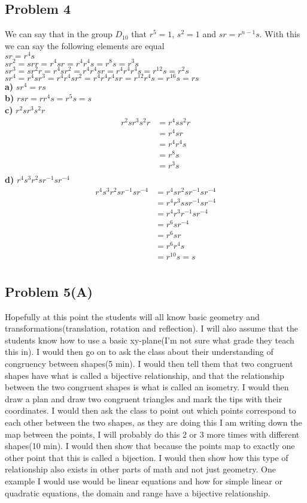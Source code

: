 \documentclass[12pt]{article}
\begin{document}
\subsection*{Problem 4}
We can say that in the group $D_{10}$ that $r^5 = 1$, $s^2 = 1$ and $sr = r^{n-1}s$. With this we can say the following elements are equal\\
$sr = r^4s$\\
$sr^2 = sr  r = r^4  s  r = r^4  r^4  s = r^8  s = r^3s$\\
$sr^3 = sr^2  r = r^4  s  r^2 = r^4  r^4  s  r = r^4  r^4  r^4  s =r^{12}  s = r^2s$\\
$sr^4 = r^4  s  r^3 = r^4  r^4  s  r^2 = r^4  r^4  r^4  s  r = r^{12}  r^4  s = r^{16}  s = r s$\\
\textbf{a) } $sr^4 = rs$\\
\textbf{b) } $rsr = rr^4s = r^5s = s$ \\
\textbf{c) } $r^2sr^3s^2r$
\begin{align*}
r^2sr^3s^2r &= r^4ss^2r\\
&= r^4sr \\
&= r^4r^4s \\
&= r^8s \\
&= r^3s \\
\end{align*}
\textbf{d) } $r^4s^3r^2sr^{-1}sr^{-4}$
\begin{align*}
r^4s^3r^2sr^{-1}sr^{-4} &= r^4sr^2sr^{-1}sr^{-4} \\
&= r^4r^3ssr^{-1}sr^{-4} \\
&= r^4r^3r^{-1}sr^{-4} \\
&= r^6sr^{-4} \\
&= r^6sr \\
&= r^6r^4s \\
&= r^{10}s = s\\
\end{align*}
\newpage
\subsection*{Problem 5(A)}
Hopefully at this point the students will all know basic geometry and transformations(translation, rotation and reflection). I will also assume that the students know how to use  a basic xy-plane(I'm not sure what grade they teach this in). I would then go on to ask the class about their understanding of congruency between shapes(5 min). I would then tell them that two congruent shapes have what is called a bijective relationship, and that the relationship between the two congruent shapes is what is called an isometry. I would then draw a plan and draw two congruent triangles and mark the tips with their coordinates. I would then ask the class to point out which points correspond to each other between the two shapes, as they are doing this I am writing down the map between the points, I will probably do this 2 or 3 more times with different shapes(10 min). I would then show that because the points map to exactly one other point that this is called a bijection. I would then show how this type of relationship also exists in other parts of math and not just geometry. One example I would use would be linear equations and how for simple linear or quadratic equations, the domain and range have a bijective relationship.
\newpage
\end{document}
